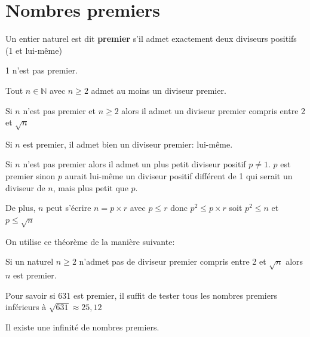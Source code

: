 \documentclass[french]{book}
\begin{document}
\section{Nombres premiers}


\begin{defn}

Un entier naturel est dit \textbf{premier} s'il admet exactement deux diviseurs positifs (1 et lui-même)

\end{defn}

\begin{rem}
1 n'est pas premier.
\end{rem}

\begin{thm}

 Tout $n\in \mathbb{N}$ avec $n\geq 2$ admet au moins un diviseur premier.

 Si $n$ n'est pas premier et $n\geq 2$ alors il admet un diviseur premier compris entre 2 et $\sqrt{n}$
 \end{thm}


\begin{demo}

Si $n$ est premier, il admet bien un diviseur premier: lui-même.

Si $n$ n'est pas premier alors il admet un plus petit diviseur positif $p\neq 1$.
$p$ est premier sinon $p$ aurait lui-même un diviseur positif différent de 1 qui serait un diviseur de $n$, mais plus petit que $p$.

De plus, $n$ peut s'écrire $n=p \times r$ avec $p\leq r$ donc $p^{2}\leq p \times r$ soit $p^{2} \leq n$ et $p\leq\sqrt{n}$

\end{demo}

\begin{rem}
On utilise ce théorème de la manière suivante:

Si un naturel $n\geq 2$ n'admet pas de diviseur premier compris entre 2 et $\sqrt{n}$ alors $n$ est premier.

\end{rem}

\begin{exemple}

Pour savoir si 631 est premier, il suffit de tester tous les nombres premiers inférieurs à $\sqrt{631}\approx25,12$

\end{exemple}

\begin{thm}
Il existe une infinité de nombres premiers.
\end{thm}
\end{document}
